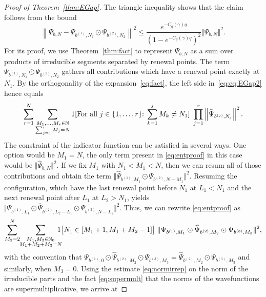\documentclass[letterpaper, DIV=17]{scrartcl}
\numberwithin{equation}{section}
\theoremstyle{definition}
\begin{document}
\begin{proof}[Proof of Theorem~\ref{thm:EGap}] 
The triangle inequality shows that the claim follows from the bound 
\begin{equation}\label{eq:eq:EGap2}
\left\| \Psi_{b,N} -  \Psi_{b^{(1)},N_1}  \odot \Psi_{b^{(2)},N_2} \right\|^2 \leq  \frac{e^{-C_q(\gamma)q}}{\left(1-e^{-C_q(\gamma)q}\right)^2}\Vert \Psi_{b,N}\Vert^2. 
\end{equation}
For its proof, we use Theorem~\ref{thm:fact} to represent $  \Psi_{b,N} $ as a sum over products of irreducible segments separated by renewal points. The term $ \Psi_{b^{(1)},N_1}  \odot \Psi_{b^{(2)},N_2}  $ gathers all contributions which have a renewal point exactly at $ N_1 $. By the orthogonality of the expansion~\eqref{eq:fact}, the left side in~\eqref{eq:eq:EGap2} hence equals 
\begin{equation}\label{eq:entproof}
\sum_{r=1}^N \sum_{ \substack{M_1, \dots , M_r \in \mathbb{N}\\  \sum_{j=1}^r M_j = N } } 1[ \mbox{For all $ j \in \{ 1, \dots , r\}$:} \; \sum_{k=1}^j M_k \neq N_1 ] \ \prod_{j=1}^r  \left\|   \widehat \Psi_{b^{(j)},N_j} \right\|^2.
\end{equation}
The constraint of the indicator function can be satisfied in several ways. One option would be $M_1=N$, the only term present in \eqref{eq:entproof} in this case would be $\Vert \widehat{\Psi}_{b,N}\Vert^2$. If we fix $M_1$ with $N_1<M_1<N$, then we can resum all of those contributions and obtain the term $\Vert \widehat{\Psi}_{b^{(1)}, M_1} \odot \Psi_{b^{(2)}, N-M_1}\Vert^2$.   
Resuming the configuration, which have the last renewal point before $N_1$ at $L_1<N_1$ and the next renewal point after $L_1$ at $L_2>N_1$, yields $\Vert \Psi_{b^{(1)}, L_1} \odot \widehat{\Psi}_{b^{(2)}, L_2-L_1} \odot \Psi_{b^{(3)}, N-L_2} \Vert^2$. Thus, we can rewrite \eqref{eq:entproof} as
\begin{align*}
	\sum_{M_2=2}^N \mkern-5mu \sum_{\substack{M_1, M_3\in \mathbb{N}_0 \\ M_1+M_2+M_3=N}} \mkern-15mu 1\big[N_1\in [M_1+1, M_1+M_2-1]\big] \;  \Vert \Psi_{b^{(1)},M_1} \odot \widehat{\Psi}_{b^{(2)}, M_2} \odot \Psi_{b^{(3)},M_3} \Vert^2,
\end{align*}
with the convention that $ \Psi_{b^{(1)},0} \odot \widehat{\Psi}_{b^{(2)}, M_2} \odot \Psi_{b^{(3)},M_3} =  \widehat{\Psi}_{b^{(2)}, M_2} \odot \Psi_{b^{(3)},M_3}$ and similarly, when $M_3=0$. Using the estimate  \eqref{eq:normirrep} on the norm of the irreducible parts and the fact \eqref{eq:supermult} that the norms of the wavefunctions are supermultiplicative, we arrive at

\end{proof}
\end{document}

